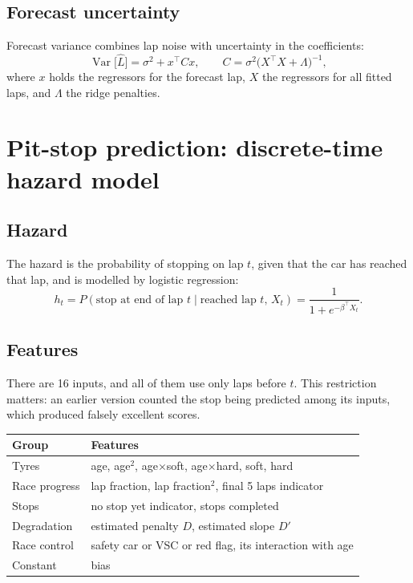 \documentclass[11pt,a4paper]{article}
\begin{document}
\subsection{Forecast uncertainty}
Forecast variance combines lap noise with uncertainty in the coefficients:
\begin{equation}
\operatorname{Var}\bigl[\hat L\bigr] = \sigma^2 + x^{\top} C x,
\qquad C = \sigma^2\bigl(X^{\top}X + \Lambda\bigr)^{-1},
\end{equation}
where $x$ holds the regressors for the forecast lap, $X$ the regressors for all fitted
laps, and $\Lambda$ the ridge penalties.

\section{Pit-stop prediction: discrete-time hazard model}

\subsection{Hazard}
The hazard is the probability of stopping on lap $t$, given that the car has reached
that lap, and is modelled by logistic regression:
\begin{equation}
h_t = P(\text{stop at end of lap } t \mid \text{reached lap } t,\, X_t)
    = \frac{1}{1+e^{-\beta^{\top} X_t}}.
\end{equation}

\subsection{Features}
There are 16 inputs, and all of them use only laps before $t$. This restriction matters:
an earlier version counted the stop being predicted among its inputs, which produced
falsely excellent scores.

\begin{center}
\small
\begin{tabular}{@{}ll@{}}
\toprule
Group & Features \\
\midrule
Tyres & age, age$^2$, age$\times$soft, age$\times$hard, soft, hard \\
Race progress & lap fraction, lap fraction$^2$, final 5 laps indicator \\
Stops & no stop yet indicator, stops completed \\
Degradation & estimated penalty $D$, estimated slope $D'$ \\
Race control & safety car or VSC or red flag, its interaction with age \\
Constant & bias \\
\bottomrule
\end{tabular}
\end{center}
\end{document}
